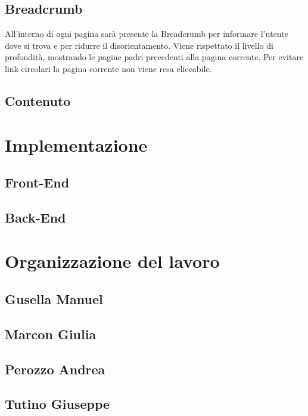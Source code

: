 \documentclass[10pt]{article}
\begin{document}
\subsection{Breadcrumb}
All'interno di ogni pagina sarà presente la Breadcrumb per informare l'utente dove si trova e per ridurre il disorientamento. Viene rispettato il livello di profondità, mostrando le pagine padri precedenti alla pagina corrente. Per evitare link circolari la pagina corrente non viene resa cliccabile.

\subsection{Contenuto}

\section{Implementazione}
\subsection{Front-End}
\subsection{Back-End}

\section{Organizzazione del lavoro}
\subsection{Gusella Manuel}
\subsection{Marcon Giulia}
\subsection{Perozzo Andrea}
\subsection{Tutino Giuseppe}
\end{document}
